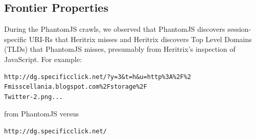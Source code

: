 \documentclass{ipres_proc_article-sp}
\begin{document}




\subsection{Frontier Properties}
\label{frontierProp}
During the PhantomJS crawls, we observed that PhantomJS discovers session-specific URI-Rs that Heritrix misses and Heritrix discovers Top Level Domains (TLDs) that PhantomJS misses, presumably from Heritrix's inspection of JavaScript. For example:  
\begin{verbatim}
http://dg.specificclick.net/?y=3&t=h&u=http%3A%2F%2
Fmisscellania.blogspot.com%2Fstorage%2F
Twitter-2.png...
\end{verbatim}
\noindent from PhantomJS versus
\begin{verbatim}
http://dg.specificclick.net/
\end{verbatim}
\end{document}
